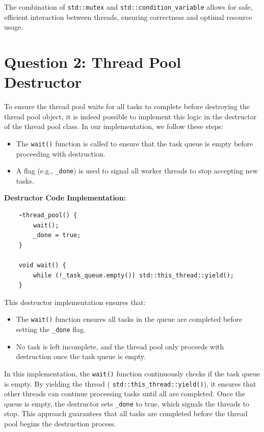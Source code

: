 \documentclass{article}
\begin{document}
 
The combination of \texttt{std::mutex} and \texttt{std::condition\_variable} allows for safe, efficient interaction between threads, ensuring correctness and optimal resource usage.

\section*{Question 2: Thread Pool Destructor}
To ensure the thread pool waits for all tasks to complete before destroying the thread pool object, it is indeed possible to implement this logic in the destructor of the thread pool class. In our implementation, we follow these steps:

\begin{itemize}
    \item The 	\texttt{wait()} function is called to ensure that the task queue is empty before proceeding with destruction.
    \item A flag (e.g., 	\texttt{\_done}) is used to signal all worker threads to stop accepting new tasks.
\end{itemize}

\textbf{Destructor Code Implementation:}

\begin{verbatim}
    ~thread_pool() {
        wait();
        _done = true;
    }
    
    void wait() {
        while (!_task_queue.empty()) std::this_thread::yield();
    }
    \end{verbatim}

This destructor implementation ensures that:
\begin{itemize}
    \item The 	\texttt{wait()} function ensures all tasks in the queue are completed before setting the 	\texttt{\_done} flag.
    \item No task is left incomplete, and the thread pool only proceeds with destruction once the task queue is empty.
\end{itemize}

In this implementation, the 	\texttt{wait()} function continuously checks if the task queue is empty. By yielding the thread (	\texttt{std::this\_thread::yield()}), it ensures that other threads can continue processing tasks until all are completed. Once the queue is empty, the destructor sets 	\texttt{\_done} to true, which signals the threads to stop. This approach guarantees that all tasks are completed before the thread pool begins the destruction process.
\end{document}

